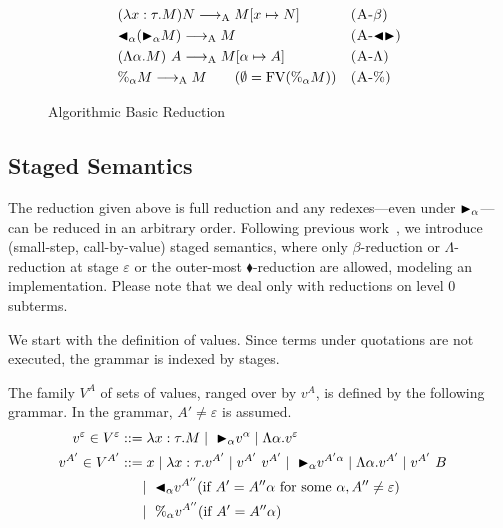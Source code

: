 \begin{figure}[tbp]
    \begin{center}
        \begin{align*}
            & (\lambda x:\tau.M) N \longrightarrow_{\text{A}} M[x \mapsto N]       &  & \textsc{(A-$\beta$)}   \\
            & {\mathop{\blacktriangleleft}}_\alpha ({\mathop{\blacktriangleright}}_\alpha M) \longrightarrow_{\text{A}} M              &  & \textsc{(A-${\mathop{\blacktriangleleft}}{\mathop{\blacktriangleright}}$)} \\
            & (\Lambda \alpha.M)\ A \longrightarrow_{\text{A}} M[\alpha \mapsto A] &  & \textsc{(A-$\Lambda$)} \\
            & \%_\alpha M \longrightarrow_{\text{A}} M \qquad (\emptyset = \text{FV}(\%_\alpha M)) &  & \textsc{(A-$\%$)}
        \end{align*}
    \end{center}
    \caption{Algorithmic Basic Reduction}
    \label{fig:algorithmic-reduction}
\end{figure}

\subsection{Staged Semantics}

The reduction given above is full reduction and any redexes---even under
${\mathop{\blacktriangleright}}_\alpha$---can be reduced in an arbitrary order.  Following previous
work~\cite{Hanada2014}, we introduce (small-step, call-by-value) staged
semantics, where only $\beta$-reduction or $\Lambda$-reduction at stage
$\varepsilon$ or the outer-most $\blacklozenge$-reduction are allowed, modeling
an implementation. Please note that we deal only with reductions on level 0
subterms.

We start with the definition of values. Since terms under quotations are
not executed, the grammar is indexed by stages.

\begin{definition}[Values]
  The family $V^A$ of sets of values, ranged over by $v^A$,
  is defined by the following grammar.  In the grammar, $A' \neq \varepsilon$ is assumed.
  \begin{align*}
    v^\varepsilon \in V^\varepsilon & ::= \lambda x:\tau.M \mid\ {\mathop{\blacktriangleright}}_\alpha v^\alpha \mid \Lambda\alpha.v^\varepsilon                                             & \\
    v^{A'} \in V^{A'}               & ::= x \mid \lambda x:\tau.v^{A'} \mid v^{A'}\ v^{A'} \mid\ {\mathop{\blacktriangleright}}_\alpha v^{A'\alpha} \mid \Lambda\alpha.v^{A'} \mid v^{A'}\ B & \\
                                    & \quad\   \mid\ {\mathop{\blacktriangleleft}}_\alpha v^{A''} (\text{if } A' = A''\alpha \text{ for some } \alpha, A'' \neq \varepsilon)               & \\
                                    & \quad\   \mid\ \%_\alpha v^{A''} (\text{if } A' = A''\alpha)
  \end{align*}
\end{definition}

